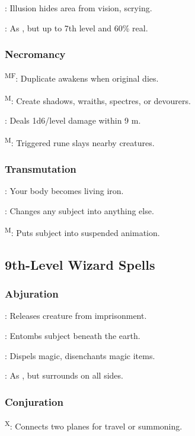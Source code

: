 	: Illusion hides area from vision, scrying.

	: As , but up to 7th level and 60\% real.

\subsubsection{Necromancy}
	\textsuperscript{MF}: Duplicate awakens when original dies.

	\textsuperscript{M}: Create shadows, wraiths, spectres, or devourers.

	: Deals 1d6/level damage within 9 m.

	\textsuperscript{M}: Triggered rune slays nearby creatures.

\subsubsection{Transmutation}
	: Your body becomes living iron.

	: Changes any subject into anything else.

	\textsuperscript{M}: Puts subject into suspended animation.



\subsection{9th-Level Wizard Spells}

\subsubsection{Abjuration}
	: Releases creature from imprisonment.

	: Entombs subject beneath the earth.

	: Dispels magic, disenchants magic items.

	: As , but surrounds on all sides.

\subsubsection{Conjuration}
	\textsuperscript{X}: Connects two planes for travel or summoning.

